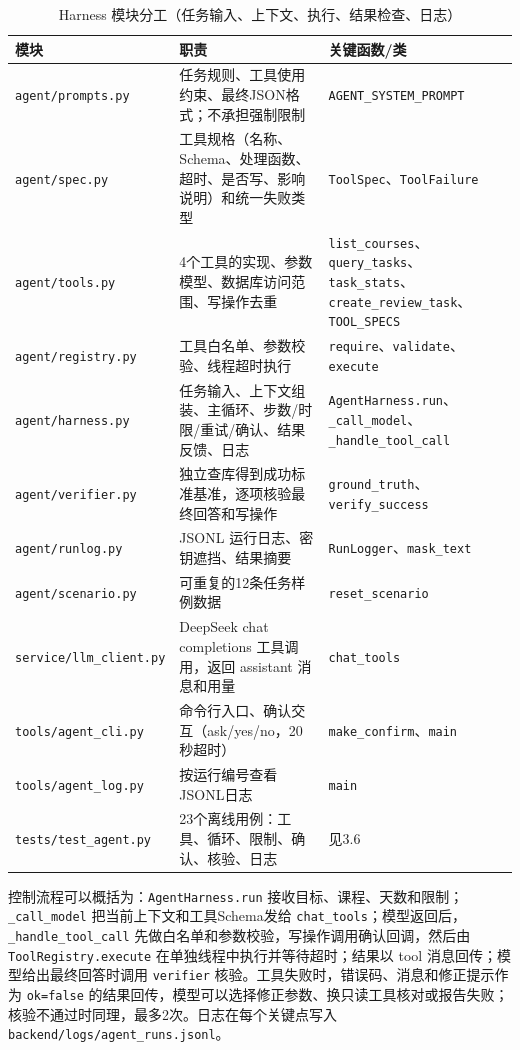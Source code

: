 \documentclass[UTF8,12pt,a4paper]{ctexart}
\begin{document}
\begin{table}[H]
\centering
\caption{Harness 模块分工（任务输入、上下文、执行、结果检查、日志）}
\label{tab:modules}
\scriptsize
\begin{tabularx}{\textwidth}{L{3.7cm}X L{2.9cm}}
\toprule
模块 & 职责 & 关键函数/类 \\
\midrule
\texttt{agent/prompts.py} & 任务规则、工具使用约束、最终JSON格式；不承担强制限制 & \texttt{AGENT\_SYSTEM\_PROMPT} \\
\texttt{agent/spec.py} & 工具规格（名称、Schema、处理函数、超时、是否写、影响说明）和统一失败类型 & \texttt{ToolSpec}、\texttt{ToolFailure} \\
\texttt{agent/tools.py} & 4个工具的实现、参数模型、数据库访问范围、写操作去重 & \texttt{list\_courses}、\texttt{query\_tasks}、\texttt{task\_stats}、\texttt{create\_review\_task}、\texttt{TOOL\_SPECS} \\
\texttt{agent/registry.py} & 工具白名单、参数校验、线程超时执行 & \texttt{require}、\texttt{validate}、\texttt{execute} \\
\texttt{agent/harness.py} & 任务输入、上下文组装、主循环、步数/时限/重试/确认、结果反馈、日志 & \texttt{AgentHarness.run}、\texttt{\_call\_model}、\texttt{\_handle\_tool\_call} \\
\texttt{agent/verifier.py} & 独立查库得到成功标准基准，逐项核验最终回答和写操作 & \texttt{ground\_truth}、\texttt{verify\_success} \\
\texttt{agent/runlog.py} & JSONL 运行日志、密钥遮挡、结果摘要 & \texttt{RunLogger}、\texttt{mask\_text} \\
\texttt{agent/scenario.py} & 可重复的12条任务样例数据 & \texttt{reset\_scenario} \\
\texttt{service/llm\_client.py} & DeepSeek chat completions 工具调用，返回 assistant 消息和用量 & \texttt{chat\_tools} \\
\texttt{tools/agent\_cli.py} & 命令行入口、确认交互（ask/yes/no，20秒超时） & \texttt{make\_confirm}、\texttt{main} \\
\texttt{tools/agent\_log.py} & 按运行编号查看JSONL日志 & \texttt{main} \\
\texttt{tests/test\_agent.py} & 23个离线用例：工具、循环、限制、确认、核验、日志 & 见3.6 \\
\bottomrule
\end{tabularx}
\end{table}

控制流程可以概括为：\texttt{AgentHarness.run} 接收目标、课程、天数和限制；\texttt{\_call\_model} 把当前上下文和工具Schema发给 \texttt{chat\_tools}；模型返回后，\texttt{\_handle\_tool\_call} 先做白名单和参数校验，写操作调用确认回调，然后由 \texttt{ToolRegistry.execute} 在单独线程中执行并等待超时；结果以 tool 消息回传；模型给出最终回答时调用 \texttt{verifier} 核验。工具失败时，错误码、消息和修正提示作为 \texttt{ok=false} 的结果回传，模型可以选择修正参数、换只读工具核对或报告失败；核验不通过时同理，最多2次。日志在每个关键点写入 \texttt{backend/logs/agent\_runs.jsonl}。
\end{document}
